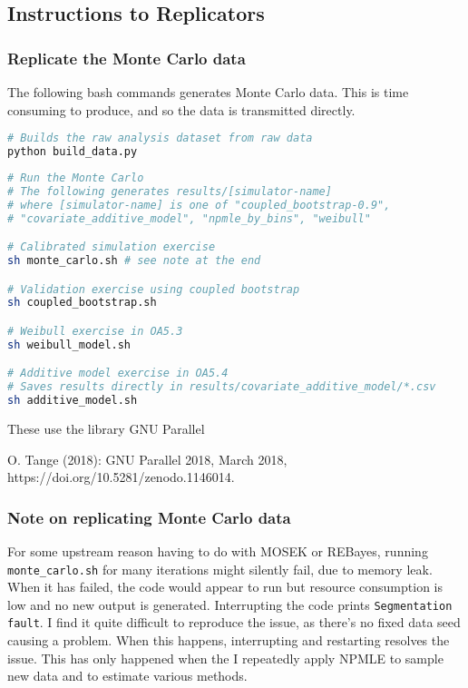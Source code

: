 \documentclass[10pt]{article}
\begin{document}

\hypertarget{instructions-to-replicators}{%
\subsection{Instructions to
Replicators}\label{instructions-to-replicators}}

\subsubsection*{Replicate the Monte Carlo data}

The following bash commands generates Monte Carlo data. This is time consuming to produce,
and so the data is transmitted directly.

\begin{lstlisting}[language=bash]
# Builds the raw analysis dataset from raw data
python build_data.py 
 \end{lstlisting} 

\begin{lstlisting}[language=bash]
# Run the Monte Carlo
# The following generates results/[simulator-name]
# where [simulator-name] is one of "coupled_bootstrap-0.9",
# "covariate_additive_model", "npmle_by_bins", "weibull"

# Calibrated simulation exercise
sh monte_carlo.sh # see note at the end

# Validation exercise using coupled bootstrap
sh coupled_bootstrap.sh

# Weibull exercise in OA5.3
sh weibull_model.sh

# Additive model exercise in OA5.4
# Saves results directly in results/covariate_additive_model/*.csv
sh additive_model.sh
\end{lstlisting}

These use the library GNU Parallel

O. Tange (2018): GNU Parallel 2018, March 2018, https://doi.org/10.5281/zenodo.1146014.

\subsubsection{Note on replicating Monte Carlo data}
  For some upstream reason having to do with MOSEK or REBayes, running
  \texttt{monte\_carlo.sh}
for many iterations might silently fail, due to memory leak. When it has failed, the code
would appear to run but resource consumption is low and no new output is generated.
Interrupting the code prints \texttt{Segmentation fault}. I find it quite difficult to
reproduce the issue, as there's no fixed data seed causing a problem. When this happens,
interrupting and restarting resolves the issue. This has only happened when the I
repeatedly apply NPMLE to sample new data and to estimate various methods.
\end{document}
